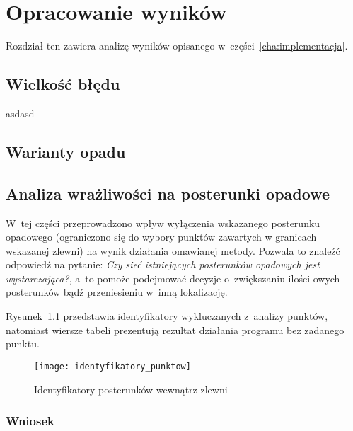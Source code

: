 \chapter{Opracowanie wyników}

Rozdział ten zawiera analizę wyników opisanego w~części~\ref{cha:implementacja}.


\section{Wielkość błędu}
asdasd

\section{Warianty opadu}

\section{Analiza wrażliwości na posterunki opadowe}
W~tej części przeprowadzono wpływ wyłączenia wskazanego posterunku opadowego (ograniczono się do wybory punktów zawartych w granicach wskazanej zlewni) na wynik działania omawianej metody. Pozwala to znaleźć odpowiedź na pytanie: \textit{Czy sieć istniejących posterunków opadowych jest wystarczająca?}, a~to pomoże podejmować decyzje o~zwiększaniu ilości owych posterunków bądź przeniesieniu w~inną lokalizację.

Rysunek~\ref{fig:identyfikatory} przedstawia identyfikatory wykluczanych z~analizy punktów, natomiast wiersze tabeli prezentują rezultat działania programu bez zadanego punktu.

\begin{figure}[ht]
	\centering
	\texttt{[image: identyfikatory\_punktow]}
	\label{fig:identyfikatory}
	\caption{Identyfikatory posterunków wewnątrz zlewni}
\end{figure}

\subsection{Wniosek}